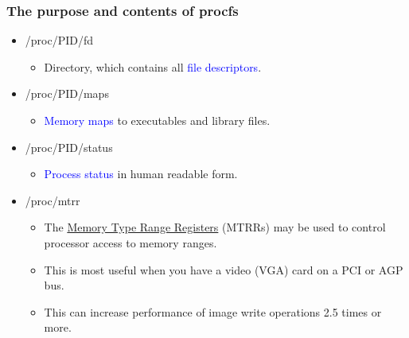 \begin{frame}[fragile]
    \frametitle{The purpose and contents of procfs}


    \begin{itemize}
        \item /proc/PID/fd
	    \begin{itemize}
	        \item Directory,  which contains all \textcolor{blue}{file descriptors}.
      \end{itemize}
        \item /proc/PID/maps
	    \begin{itemize}
	        \item \textcolor{blue}{Memory  maps} to executables and library files.
      \end{itemize}
        \item /proc/PID/status
	    \begin{itemize}
	        \item \textcolor{blue}{Process  status} in human readable form.
      \end{itemize}
        \item /proc/mtrr
	    \begin{itemize}
	        \item The \href{https://wiki.osdev.org/MTRR}{Memory Type Range Registers} (MTRRs) may be used to control processor  access to memory ranges.
          \item This is most useful when you have a video (VGA)  card on a PCI or AGP bus.
          \item This can increase performance of image write operations 2.5  times or more.
      \end{itemize}
    \end{itemize}
% 
\end{frame}
